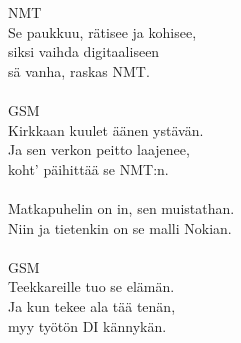
            NMT \\
            Se paukkuu, rätisee ja kohisee, \\
            siksi vaihda digitaaliseen \\
            sä vanha, raskas NMT. \\
\hspace{10mm} \\
            GSM \\
            Kirkkaan kuulet äänen ystävän. \\
            Ja sen verkon peitto laajenee, \\
            koht’ päihittää se NMT:n. \\
\hspace{10mm} \\
            Matkapuhelin on in, sen muistathan. \\
            Niin ja tietenkin on se malli Nokian. \\
\hspace{10mm} \\
            GSM \\
            Teekkareille tuo se elämän. \\
            Ja kun tekee ala tää tenän, \\
            myy työtön DI kännykän. \\

